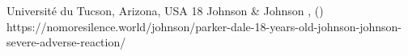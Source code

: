           {Université du Tucson, Arizona, USA}
          {18}
          {Johnson \& Johnson}
          {}
          {
            ,
             ()
          }
          {https://nomoresilence.world/johnson/parker-dale-18-years-old-johnson-johnson-severe-adverse-reaction/}


